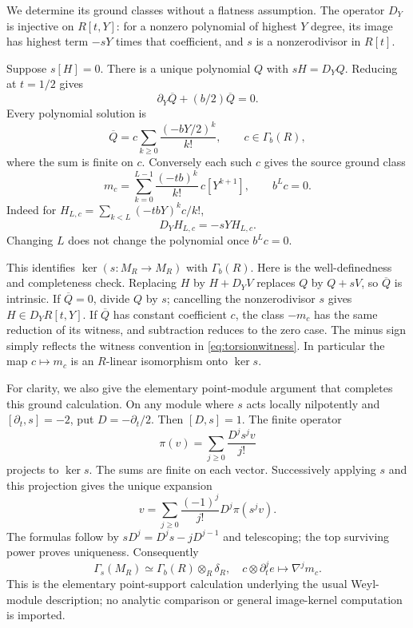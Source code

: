 \documentclass[11pt]{article}
\theoremstyle{definition}\newtheorem{definition}[theorem]{Definition}
\theoremstyle{remark}\newtheorem{remark}[theorem]{Remark}
\begin{document}
We determine its ground classes without a flatness assumption.
The operator $D_Y$ is injective on $R[t,Y]$: for a nonzero
polynomial of highest $Y$ degree, its image has highest term
$-sY$ times that coefficient, and $s$ is a nonzerodivisor in
$R[t]$.

Suppose $s[H]=0$. There is a unique polynomial $Q$ with
$sH=D_YQ$. Reducing at $t=1/2$ gives
\[
 \partial_Y\overline Q+(b/2)\overline Q=0.
\]
Every polynomial solution is
\[
 \overline Q=c\sum_{k\ge0}\frac{(-bY/2)^k}{k!},
 \qquad c\in\Gamma_b(R),
\]
where the sum is finite on $c$. Conversely each such $c$ gives
the source ground class
\begin{equation}\label{eq:ground}
 m_c=\sum_{k=0}^{L-1}\frac{(-tb)^k}{k!}\,c[Y^{k+1}],
                  \qquad b^Lc=0.
\end{equation}
Indeed for $H_{L,c}=\sum_{k<L}(-tbY)^kc/k!$,
\begin{equation}\label{eq:torsionwitness}
 D_YH_{L,c}=-sYH_{L,c}.
\end{equation}
Changing $L$ does not change the polynomial once $b^Lc=0$.

This identifies $\ker(s:M_R\to M_R)$ with $\Gamma_b(R)$.
Here is the well-definedness and completeness check. Replacing
$H$ by $H+D_YV$ replaces $Q$ by $Q+sV$, so $\overline Q$
is intrinsic. If $\overline Q=0$, divide $Q$ by $s$; cancelling
the nonzerodivisor $s$ gives $H\in D_YR[t,Y]$. If
$\overline Q$ has constant coefficient $c$, the class $-m_c$
has the same reduction of its witness, and subtraction reduces
to the zero case. The minus sign simply reflects the witness
convention in \eqref{eq:torsionwitness}. In particular the map
$c\mapsto m_c$ is an $R$-linear isomorphism onto $\ker s$.

For clarity, we also give the elementary point-module argument
that completes this ground calculation. On any module where
$s$ acts locally nilpotently and $[\partial_t,s]=-2$, put
$D=-\partial_t/2$. Then $[D,s]=1$. The finite operator
\[
 \pi(v)=\sum_{j\ge0}\frac{D^js^jv}{j!}
\]
projects to $\ker s$. The sums are finite on each vector.
Successively applying $s$ and this projection gives the unique
expansion
\[
 v=\sum_{j\ge0}\frac{(-1)^j}{j!}D^j\pi(s^jv).
\]
The formulas follow by $sD^j=D^js-jD^{j-1}$ and telescoping;
the top surviving power proves uniqueness. Consequently
\begin{equation}\label{eq:fulltorsion}
 \Gamma_s(M_R)\simeq\Gamma_b(R)\otimes_R\delta_R,
 \quad c\otimes\partial_t^je\longmapsto\nabla^jm_c.
\end{equation}
This is the elementary point-support calculation underlying the
usual Weyl-module description; no analytic comparison or
general image-kernel computation is imported.
\end{document}
